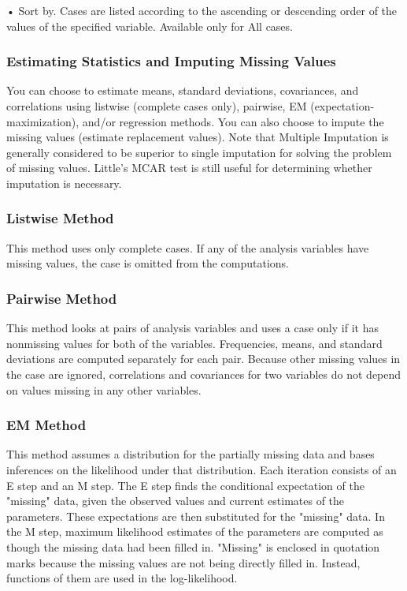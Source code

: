 • Sort by. Cases are listed according to the ascending or descending order of the values of the specified variable. Available only for All cases.

\subsubsection*{Estimating Statistics and Imputing Missing Values}

You can choose to estimate means, standard deviations, covariances, and correlations using listwise (complete cases only), pairwise, EM (expectation-maximization), and/or regression methods. You can also choose to impute the missing values (estimate replacement values). Note that Multiple Imputation is generally considered to be superior to single imputation for solving the problem of missing values. Little's MCAR test is still useful for determining whether imputation is necessary.

\subsubsection*{Listwise Method}

This method uses only complete cases. If any of the analysis variables have missing values, the case is omitted from the computations.

\subsubsection*{Pairwise Method}

This method looks at pairs of analysis variables and uses a case only if it has nonmissing values for both of the variables. Frequencies, means, and standard deviations are computed separately for each pair. Because other missing values in the case are ignored, correlations and covariances for two variables do not depend on values missing in any other variables.

\subsubsection*{EM Method}

This method assumes a distribution for the partially missing data and bases inferences on the likelihood under that distribution. Each iteration consists of an E step and an M step. The E step finds the conditional expectation of the "missing" data, given the observed values and current estimates of the parameters. These expectations are then substituted for the "missing" data. In the M step, maximum likelihood estimates of the parameters are computed as though the missing data had been filled in. "Missing" is enclosed in quotation marks because the missing values are not being directly filled in. Instead, functions of them are used in the log-likelihood.

